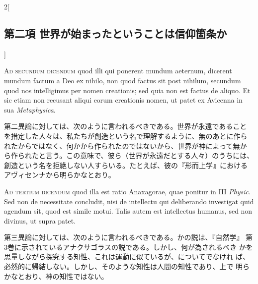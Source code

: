 \documentclass[paper=a4paper,fontsize=10pt,jafontsize=9pt,titlepage]{jlreq}
\begin{document}
\begin{paracol}{2}[\subsection{第二項 世界が始まったということは信仰箇条か}]
\switchcolumn*[\subsection{ad.2}]


{\scshape Ad secundum dicendum} quod illi qui ponerent mundum aeternum, dicerent
 mundum factum a Deo ex nihilo, non quod factus sit post nihilum,
 secundum quod nos intelligimus per nomen creationis; sed quia non est
 factus de aliquo. Et sic etiam non recusant
aliqui eorum creationis
 nomen, ut patet ex Avicenna in sua {\itshape Metaphysica}.


\switchcolumn


第二異論に対しては、次のように言われるべきである。世界が永遠であること
を措定した人々は、私たちが創造という名で理解するように、無のあとに作ら
れたからではなく、何かから作られたのではないから、世界が神によって無か
ら作られたと言う。この意味で、彼ら（世界が永遠だとする人々）のうちには、
創造という名を拒絶しない人すらいる。たとえば、彼の『形而上学』における
アヴィセンナから明らかなとおり。


\switchcolumn*[\subsection{ad.3}]


{\scshape Ad tertium dicendum} quod illa est ratio Anaxagorae, quae ponitur
 in III {\itshape Physic}. Sed non de necessitate concludit, nisi de intellectu qui
 deliberando investigat quid agendum sit, quod est simile motui. Talis
 autem est intellectus humanus, sed non divinus, ut supra patet.


\switchcolumn


第三異論に対しては、次のように言われるべきである。かの説は、『自然学』
第3巻に示されているアナクサゴラスの説である。しかし、何が為されるべき
かを思量しながら探究する知性、これは運動に似ているが、についてでなけれ
ば、必然的に帰結しない。しかし、そのような知性は人間の知性であり、上で
明らかなとおり、神の知性ではない。


\switchcolumn*[\subsection{ad.4}]



\end{paracol}
\end{document}
